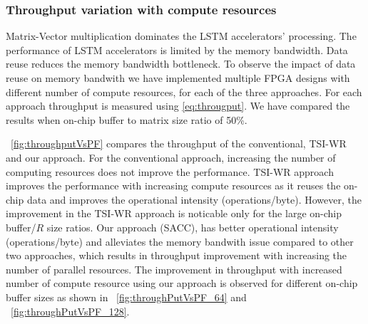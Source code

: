 {{{\subsubsection{Throughput variation with compute resources}
Matrix-Vector multiplication dominates the LSTM accelerators' processing. The performance of LSTM accelerators is limited by the memory bandwidth. Data reuse reduces the memory bandwidth bottleneck. To observe the impact of data reuse on memory bandwith we have implemented multiple FPGA designs with different number of compute resources, for each of the three approaches. For each approach throughput is measured using \eqref{eq:througput}. We have compared the results when on-chip buffer to matrix size ratio of 50\%. 

\figurename{~\ref{fig:throughputVsPF}} compares the throughput of the conventional, TSI-WR and our approach. 
For the conventional approach, increasing the number of computing resources does not improve the performance. TSI-WR approach improves the performance with increasing compute resources as it reuses the on-chip data and improves the operational intensity (operations/byte). However, the improvement in the TSI-WR approach is noticable only for the large on-chip buffer/$R$ size ratios. Our approach (SACC), has better operational intensity (operations/byte) and alleviates the memory bandwith issue compared to other two approaches, which results in throughput improvement with increasing the number of parallel resources. The improvement in throughput with increased number of compute resource using our approach is observed for different on-chip buffer sizes as shown in \figurename{~\ref{fig:throughPutVsPF_64}} and \figurename{~\ref{fig:throughPutVsPF_128}}.
}}}
